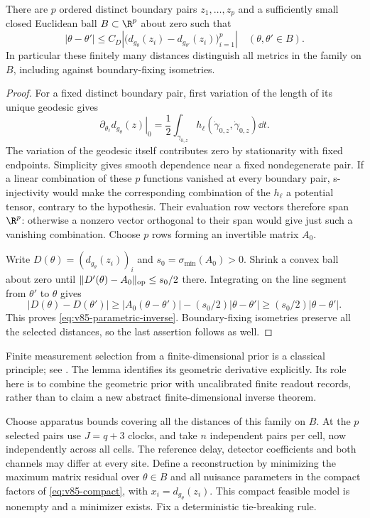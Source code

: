 \begin{lemma}\label{lem:v85-geometric-design}
There are $p$ ordered distinct boundary pairs $z_1,\ldots,z_p$ and
a sufficiently small closed Euclidean ball $B\subset\R^p$ about zero
such that
\begin{equation}\label{eq:v85-parametric-inverse}
 |\theta-\theta'|\le C_D
       \left|\bigl(d_{g_\theta}(z_i)-d_{g_{\theta'}}(z_i)\bigr)_{i=1}^p\right|
                                     \quad(\theta,\theta'\in B).
\end{equation}
In particular these finitely many distances distinguish all metrics in
the family on $B$, including against boundary-fixing isometries.
\end{lemma}
\begin{proof}
For a fixed distinct boundary pair, first variation of the length of
its unique geodesic gives
\[
 \left.\partial_{\theta_\ell}d_{g_\theta}(z)\right|_0
       =\frac12\int_{\gamma_{0,z}}
                   h_\ell(\dot\gamma_{0,z},\dot\gamma_{0,z})\dd t.
\]
The variation of the geodesic itself contributes zero by stationarity
with fixed endpoints. Simplicity gives smooth dependence near a fixed
nondegenerate pair. If a linear combination of these $p$ functions
vanished at every boundary pair, s-injectivity would make the
corresponding combination of the $h_\ell$ a potential tensor,
contrary to the hypothesis. Their evaluation row vectors therefore
span $\R^p$: otherwise a nonzero vector orthogonal to their span
would give just such a vanishing combination. Choose $p$ rows forming
an invertible matrix $A_0$.

Write $D(\theta)=(d_{g_\theta}(z_i))_i$ and
$s_0=\sigma_{\min}(A_0)>0$. Shrink a convex ball about zero until
$\|D'(\theta)-A_0\|_{\rm op}\le s_0/2$ there. Integrating on the
line segment from $\theta'$ to $\theta$ gives
\[
 |D(\theta)-D(\theta')|
 \ge |A_0(\theta-\theta')|-(s_0/2)|\theta-\theta'|
 \ge(s_0/2)|\theta-\theta'|.
\]
This proves \eqref{eq:v85-parametric-inverse}. Boundary-fixing
isometries preserve all the selected distances, so the last assertion
follows as well.
\end{proof}
Finite measurement selection from a finite-dimensional prior is a
classical principle; see \cite{V85AS}. The lemma identifies its
geometric derivative explicitly. Its role here is to combine the
geometric prior with uncalibrated finite readout records, rather than
to claim a new abstract finite-dimensional inverse theorem.

Choose apparatus bounds covering all the distances of this family
on $B$. At the $p$ selected pairs use $J=q+3$ clocks, and take $n$
independent pairs per cell, now independently across all cells. The
reference delay, detector coefficients and both channels may differ
at every site. Define a reconstruction by minimizing the maximum
matrix residual over $\theta\in B$ and all nuisance parameters in
the compact factors of \eqref{eq:v85-compact}, with
$x_i=d_{g_\theta}(z_i)$. This compact feasible model is nonempty and
a minimizer exists. Fix a deterministic tie-breaking rule.

